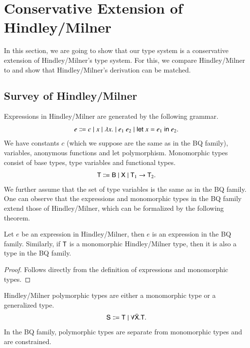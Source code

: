 \documentclass{report}
\begin{document}
  \chapter{Conservative Extension of Hindley/Milner}
  In this section, we are going to show that our type system is a conservative
  extension of Hindley/Milner's type system. For this, we compare Hindley/Milner to
  \BQsa and show that Hindley/Milner's derivation can be matched.
  
  \section{Survey of Hindley/Milner}
  Expressions in Hindley/Milner are generated by the following grammar.
  \begin{displaymath}
    e \Coloneqq c
      \mid x
      \mid \lambda x.
      \mid {e_1} \ {e_2}
      \mid \textsf{let } {x} = {e_1} \textsf{ in } {e_2}{.}
  \end{displaymath}
  We have constants $c$ (which we suppose are the same as in the BQ family), variables,
  anonymous functions and let polymorphism.
  Monomorphic types consist of base types, type variables and functional
  types.
  \begin{displaymath}
    \textsf{T} \Coloneqq \textsf{B}
             \mid \textsf{X}
             \mid \textsf{T}_1\rightarrow\textsf{T}_2{.}
  \end{displaymath}
  We further assume that the set of type variables is the same as in the BQ family.
  One can observe that the expressions and monomorphic types in the BQ family
  extend those of Hindley/Milner, which can be formalized by the following theorem.
  \begin{thm}
    Let $e$ be an expression in Hindley/Milner, then $e$ is an expression in the BQ family. Similarly,
    if $\textsf{T}$ is a monomorphic Hindley/Milner type, then it is also a type in the BQ family.
  \end{thm}
  \begin{proof}
    Follows directly from the definition of expressions and monomorphic types.
  \end{proof}
  Hindley/Milner polymorphic types are either a monomorphic type or a generalized type.
  \begin{displaymath}
    \textsf{S} \Coloneqq \textsf{T}
             \mid \forall\bar{\textsf{X}}.\textsf{T}{.}
  \end{displaymath}
  In the BQ family, polymorphic types are separate from monomorphic types and are constrained.
\end{document}
